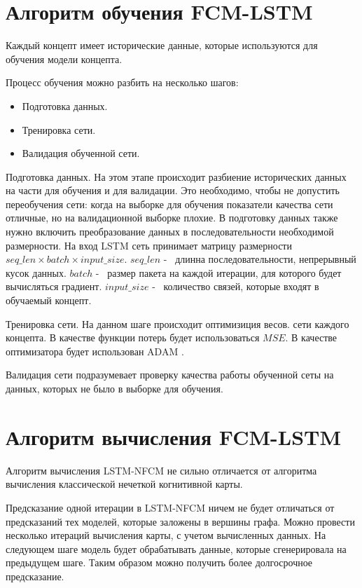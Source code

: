 \section{Алгоритм обучения FCM-LSTM}

Каждый концепт имеет исторические данные, которые используются
для обучения модели концепта.

Процесс обучения можно разбить на несколько шагов:

\begin{itemize}
	\item Подготовка данных.
	\item Тренировка сети.
	\item Валидация обученной сети.
\end{itemize}

Подготовка данных. На этом этапе происходит разбиение
исторических данных на части для обучения и для валидации.
Это необходимо, чтобы не допустить переобучения сети:
когда на выборке для обучения показатели качества сети
отличные, но на валидационной выборке плохие.
В подготовку данных также нужно включить преобразование данных
в последовательности необходимой размерности. На вход
LSTM сеть принимает матрицу размерности $ seq\_len \times batch \times input\_size $.
$ seq\_len $ -~ длинна последовательности, непрерывный кусок данных.
$ batch $ -~ размер пакета на каждой итерации, для которого будет вычисляться градиент.
$ input\_size $ -~ количество связей, которые входят в обучаемый концепт.

Тренировка сети. На данном шаге происходит оптимизиция весов.
сети каждого концепта. В качестве функции потерь будет использоваться $ MSE $.
В качестве оптимизатора будет использован ADAM \cite{adam2014}.

Валидация сети подразумевает
проверку качества работы обученной сеты на данных,
которых не было в выборке для обучения.

\section{Алгоритм вычисления FCM-LSTM}

Алгоритм вычисления LSTM-NFCM не сильно отличается от
алгоритма вычисления классической нечеткой когнитивной карты.

Предсказание одной итерации в LSTM-NFCM ничем не будет отличаться
от предсказаний тех моделей, которые заложены в вершины графа.
Можно провести несколько итераций вычисления карты, с учетом вычисленных
данных. На следующем шаге модель будет обрабатывать данные,
которые сгенерировала на предыдущем шаге. Таким образом можно получить
более долгосрочное предсказание.

